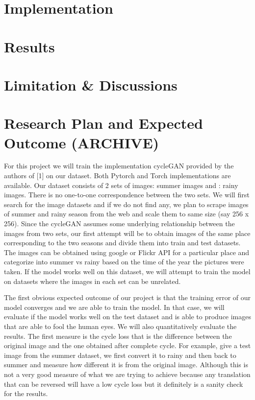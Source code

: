 \documentclass{article}
\begin{document}
\section{Implementation}

\section{Results}




\section{Limitation \& Discussions}

\section{Research Plan and Expected Outcome (ARCHIVE)}
\label{headings}

For this project we will train the implementation cycleGAN provided by the 
authors of [1] on our dataset. Both Pytorch and Torch implementations are 
available. Our dataset consists of 2 sets of images: summer images and :
rainy images. There is no one-to-one correspondence between the two sets. 
We will first search for the image datasets and if we do not find any, we 
plan to scrape images of summer and rainy season from the web and scale 
them to same size (say 256 x 256). Since the cycleGAN assumes some 
underlying relationship between the images from two sets, our first 
attempt will be to obtain images of the same place corresponding to the 
two seasons and divide them into train and test datasets. The images can
be obtained using google or Flickr API for a particular place and 
categorize into summer vs rainy based on the time of the year the 
pictures were taken. If the model works well on this dataset, we will 
attempt to train the model on datasets where the images in each set can 
be unrelated.

The first obvious expected outcome of our project is that the training 
error of our model converges and we are able to train the model. In that 
case, we will evaluate if the model works well on the test dataset and is 
able to produce images that are able to fool the human eyes. We will also 
quantitatively evaluate the results. The first measure is the cycle loss 
that is the difference between the original image and the one obtained 
after complete cycle. For example, give a test image from the summer 
dataset, we first convert it to rainy and then back to summer and measure 
how different it is from the original image. Although this is not a very 
good measure of what we are trying to achieve because any translation that 
can be reversed will have a low cycle loss but it definitely is a sanity 
check for the results.
\end{document}
